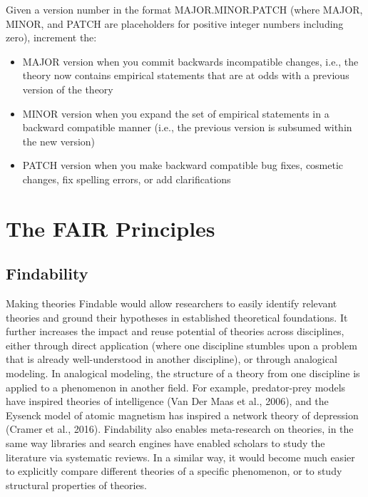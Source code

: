 \documentclass[
  man, noextraspace,floatsintext]{apa6}
\providecommand{\tightlist}{%
  \setlength{\itemsep}{0pt}\setlength{\parskip}{0pt}}
\begin{document}
Given a version number in the format MAJOR.MINOR.PATCH (where MAJOR, MINOR, and PATCH are placeholders for positive integer numbers including zero), increment the:

\begin{itemize}
\tightlist
\item
  MAJOR version when you commit backwards incompatible changes, i.e., the
  theory now contains empirical statements that are at odds with
  a previous version of the theory
\item
  MINOR version when you expand the set of empirical statements in a
  backward compatible manner (i.e., the previous version is
  subsumed within the new version)
\item
  PATCH version when you make backward compatible bug fixes, cosmetic
  changes, fix spelling errors, or add clarifications
\end{itemize}

\section{The FAIR Principles}\label{the-fair-principles}

\subsection{Findability}\label{findability}

Making theories Findable would allow researchers to easily identify relevant theories
and ground their hypotheses in established theoretical foundations.
It further increases the impact and reuse potential of theories across disciplines,
either through direct application (where one discipline stumbles upon a problem that is already well-understood in another discipline),
or through analogical modeling.
In analogical modeling, the structure of a theory from one discipline is applied to a phenomenon in another field.
For example, predator-prey models have inspired theories of intelligence (Van Der Maas et al., 2006), and the Eysenck model of atomic magnetism has inspired a network theory of depression (Cramer et al., 2016).
Findability also enables meta-research on theories,
in the same way libraries and search engines have enabled scholars to study the literature via systematic reviews.
In a similar way, it would become much easier to explicitly compare different theories of a specific phenomenon,
or to study structural properties of theories.
\end{document}
